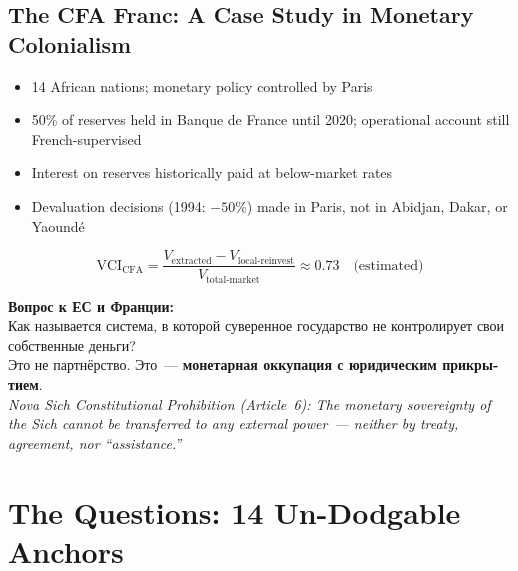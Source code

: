 \documentclass[11pt,a4paper]{article}
\theoremstyle{definition}
\theoremstyle{remark}
\begin{document}
\subsection{The CFA Franc: A Case Study in Monetary Colonialism}
\label{sec:cfa}

\begin{scibox}
\begin{itemize}[noitemsep]
  \item 14 African nations; monetary policy controlled by Paris
  \item 50\% of reserves held in Banque de France until 2020;
    operational account still French-supervised
  \item Interest on reserves historically paid at below-market rates
  \item Devaluation decisions (1994: $-50\%$) made in Paris,
    not in Abidjan, Dakar, or Yaoundé
\end{itemize}

\[
  \text{VCI}_{\text{CFA}} = \frac{V_{\text{extracted}} -
  V_{\text{local-reinvest}}}{V_{\text{total-market}}}
  \approx 0.73 \quad \text{(estimated)}
\]

\foreignlanguage{russian}{
\textbf{Вопрос к ЕС и Франции:}\\
Как называется система, в которой суверенное государство
не контролирует свои собственные деньги?\\
Это не партнёрство. Это~--- \textbf{монетарная оккупация
с юридическим прикрытием}.\\[0.2cm]
}
\textit{Nova Sich Constitutional Prohibition (Article~6):
The monetary sovereignty of the Sich cannot be
transferred to any external power~---
neither by treaty, agreement, nor ``assistance.''}
\end{scibox}

\newpage

\section{The Questions: 14 Un-Dodgable Anchors}
\label{sec:questions}
\end{document}

